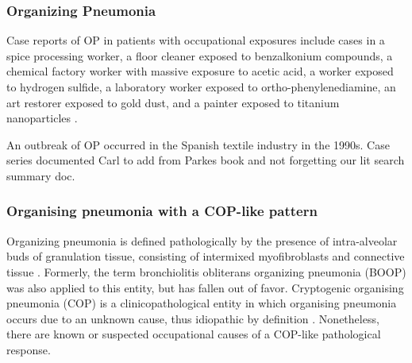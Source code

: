 \documentclass[a4paper,12pt]{article}
\begin{document}
\subsubsection{Organizing Pneumonia}

Case reports of OP in patients with occupational exposures include cases in a spice processing worker, a floor cleaner exposed to benzalkonium compounds, a chemical factory worker with massive exposure to acetic acid, a worker exposed to hydrogen sulfide, a laboratory worker exposed to ortho-phenylenediamine, an art restorer exposed to gold dust, and a painter exposed to titanium nanoparticles \cite{Alleman2002}\cite{Stefano2003}\cite{Sheu2008}\cite{Doujaiji2010}\cite{Sanchez-Ortiz2011}\cite{Ribeiro2011}\cite{Cheng2012}.

An outbreak of OP occurred in the Spanish textile industry in the 1990s.  Case series documented 
Carl to add from Parkes book and not forgetting our lit search summary doc.

\subsubsection{Organising pneumonia with a COP-like pattern}
Organizing pneumonia is defined pathologically by the presence of intra-alveolar buds of granulation tissue, consisting of intermixed myofibroblasts and connective tissue \cite{Cordier2000}. Formerly, the term bronchiolitis obliterans organizing pneumonia (BOOP) was also applied to this entity, but has fallen out of favor. Cryptogenic organising pneumonia (COP) is a clinicopathological entity in which organising pneumonia occurs due to an unknown cause, thus idiopathic by definition \cite{Bradley2008}. Nonetheless, there are known or suspected occupational causes of a COP-like pathological response.
\end{document}
